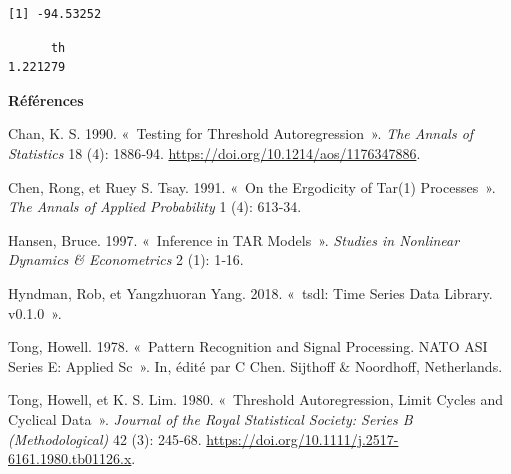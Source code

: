 \documentclass[
  french,
]{article}
\newenvironment{Shaded}{\begin{snugshade}}{\end{snugshade}}
\newcommand{\NormalTok}[1]{#1}
\newcommand{\SpecialCharTok}[1]{\textcolor[rgb]{0.00,0.00,0.00}{#1}}
\newlength{\cslhangindent}
\newlength{\cslentryspacingunit} %
\newenvironment{CSLReferences}[2] %
 {%
  \setlength{\parindent}{0pt}
  \ifodd #1
  \let\oldpar\par
  \def\par{\hangindent=\cslhangindent\oldpar}
  \fi
  \setlength{\parskip}{#2\cslentryspacingunit}
 }%
 {}
\begin{document}
\begin{verbatim}
[1] -94.53252
\end{verbatim}

\begin{Shaded}
\end{Shaded}

\begin{verbatim}
      th 
1.221279 
\end{verbatim}

\textbf{Références}

\hypertarget{refs}{}
\begin{CSLReferences}{1}{0}
\leavevmode{}%
Chan, K. S. 1990. {«~{Testing for Threshold Autoregression}~»}.
\emph{The Annals of Statistics} 18 (4): 1886‑94.
\url{https://doi.org/10.1214/aos/1176347886}.

\leavevmode{}%
Chen, Rong, et Ruey S. Tsay. 1991. {«~On the Ergodicity of Tar(1)
Processes~»}. \emph{The Annals of Applied Probability} 1 (4): 613‑34.

\leavevmode{}%
Hansen, Bruce. 1997. {«~Inference in TAR Models~»}. \emph{Studies in
Nonlinear Dynamics \& Econometrics} 2 (1): 1‑16.

\leavevmode{}%
Hyndman, Rob, et Yangzhuoran Yang. 2018. {«~tsdl: Time Series Data
Library. v0.1.0~»}.

\leavevmode{}%
Tong, Howell. 1978. {«~Pattern Recognition and Signal Processing. NATO
ASI Series E: Applied Sc~»}. In, édité par C Chen. Sijthoff \&
Noordhoff, Netherlands.

\leavevmode{}%
Tong, Howell, et K. S. Lim. 1980. {«~Threshold Autoregression, Limit
Cycles and Cyclical Data~»}. \emph{Journal of the Royal Statistical
Society: Series B (Methodological)} 42 (3): 245‑68.
\url{https://doi.org/10.1111/j.2517-6161.1980.tb01126.x}.

\end{CSLReferences}
\end{document}
